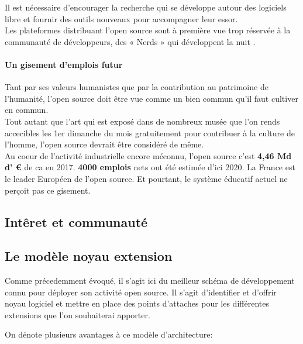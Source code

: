 			Il est nécessaire d'encourager la recherche qui se développe autour des logiciels libre et fournir des outils nouveaux pour accompagner leur essor.\\

			Les plateformes distribuant l'open source sont à première vue trop réservée à la communauté de développeurs, des « Nerds » qui développent la nuit .

			\paragraph{Un gisement d'emplois futur\\}

			Tant par ses valeurs humanistes que par la contribution au patrimoine de l'humanité, l'open source doit être vue comme un bien commun qu'il faut cultiver en commun.\\

			Tout autant que l'art qui est exposé dans de nombreux musée que l'on rends accecibles les 1er dimanche du mois gratuitement pour contribuer à la culture de l'homme, l'open source devrait être considéré de même.\\

			Au coeur de l'activité industrielle encore méconnu, l'open source c'est \textbf{4,46 Md d' \euro{}} de \acrshort{ca} en 2017. \textbf{4000 emplois} nets ont été estimée d'ici 2020. La France est le leader Européen de l'open source. Et pourtant, le système éducatif actuel ne perçoit pas ce gisement. 

		\subsection{Intêret et communauté}

		\subsection{Le modèle noyau extension}

			Comme précedemment évoqué, il s'agit ici du meilleur schéma de développement connu pour déployer son activité open source. Il s'agit d'identifier et d'offrir noyau logiciel et mettre en place des points d'attaches pour les différentes extensions que l'on souhaiterai apporter.

			On dénote plusieurs avantages à ce modèle d'architecture:

